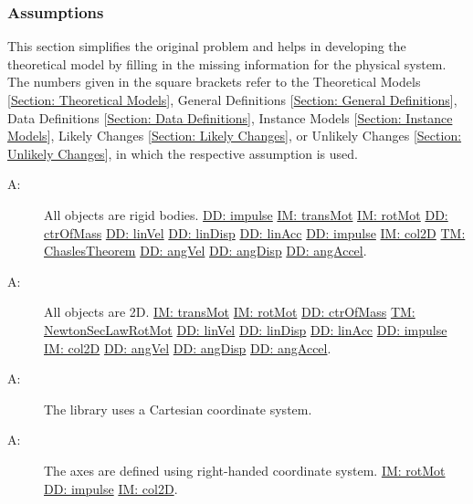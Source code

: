 \documentclass[12pt]{article}
\newcounter{assumpnum}
\newcommand{\atheassumpnum}{A\theassumpnum}
\begin{document}
\subsubsection{Assumptions}
\label{Sec:Assumps}
This section simplifies the original problem and helps in developing the theoretical model by filling in the missing information for the physical system. The numbers given in the square brackets refer to the Theoretical Models {[}\hyperref[Sec:TMs]{Section: Theoretical Models}{]}, General Definitions {[}\hyperref[Sec:GDs]{Section: General Definitions}{]}, Data Definitions {[}\hyperref[Sec:DDs]{Section: Data Definitions}{]}, Instance Models {[}\hyperref[Sec:IMs]{Section: Instance Models}{]}, Likely Changes {[}\hyperref[Sec:LCs]{Section: Likely Changes}{]}, or Unlikely Changes {[}\hyperref[Sec:UCs]{Section: Unlikely Changes}{]}, in which the respective assumption is used.
\begin{description}
\item[\atheassumpnum\label{A:objectTy}:]All objects are rigid bodies. \hyperref[DD:impulse]{DD: impulse} \hyperref[IM:transMot]{IM: transMot} \hyperref[IM:rotMot]{IM: rotMot} \hyperref[DD:ctrOfMass]{DD: ctrOfMass} \hyperref[DD:linVel]{DD: linVel} \hyperref[DD:linDisp]{DD: linDisp} \hyperref[DD:linAcc]{DD: linAcc} \hyperref[DD:impulse]{DD: impulse} \hyperref[IM:col2D]{IM: col2D} \hyperref[T:chaslesThm]{TM: ChaslesTheorem} \hyperref[DD:angVel]{DD: angVel} \hyperref[DD:angDisp]{DD: angDisp} \hyperref[DD:angAccel]{DD: angAccel}.
\end{description}
\begin{description}
\item[\atheassumpnum\label{A:objectDimension}:]All objects are 2D. \hyperref[IM:transMot]{IM: transMot} \hyperref[IM:rotMot]{IM: rotMot} \hyperref[DD:ctrOfMass]{DD: ctrOfMass} \hyperref[T:newtonSLR]{TM: NewtonSecLawRotMot} \hyperref[DD:linVel]{DD: linVel} \hyperref[DD:linDisp]{DD: linDisp} \hyperref[DD:linAcc]{DD: linAcc} \hyperref[DD:impulse]{DD: impulse} \hyperref[IM:col2D]{IM: col2D} \hyperref[DD:angVel]{DD: angVel} \hyperref[DD:angDisp]{DD: angDisp} \hyperref[DD:angAccel]{DD: angAccel}.
\end{description}
\begin{description}
\item[\atheassumpnum\label{A:coordinateSystemTy}:]The library uses a Cartesian coordinate system.
\end{description}
\begin{description}
\item[\atheassumpnum\label{A:axesDefined}:]The axes are defined using right-handed coordinate system. \hyperref[IM:rotMot]{IM: rotMot} \hyperref[DD:impulse]{DD: impulse} \hyperref[IM:col2D]{IM: col2D}.
\end{description}
\end{document}
